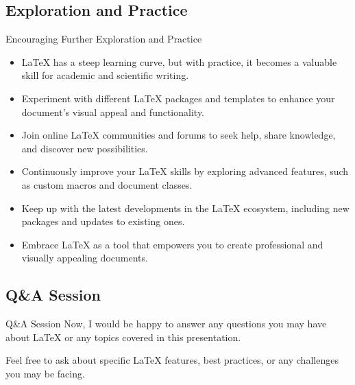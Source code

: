 \documentclass{SUSTechBeamer}
\begin{document}
\subsection{Exploration and Practice}
\begin{frame}{Encouraging Further Exploration and Practice}
\begin{itemize}
    \item LaTeX has a steep learning curve, but with practice, it becomes a valuable skill for academic and scientific writing.
    \item Experiment with different LaTeX packages and templates to enhance your document's visual appeal and functionality.
    \item Join online LaTeX communities and forums to seek help, share knowledge, and discover new possibilities.
    \item Continuously improve your LaTeX skills by exploring advanced features, such as custom macros and document classes.
    \item Keep up with the latest developments in the LaTeX ecosystem, including new packages and updates to existing ones.
    \item Embrace LaTeX as a tool that empowers you to create professional and visually appealing documents.
\end{itemize}
\end{frame}

\subsection{Q\&A Session}
\begin{frame}{Q\&A Session}
    Now, I would be happy to answer any questions you may have about LaTeX or any topics covered in this presentation.

    Feel free to ask about specific LaTeX features, best practices, or any challenges you may be facing.
\end{frame}
\end{document}
